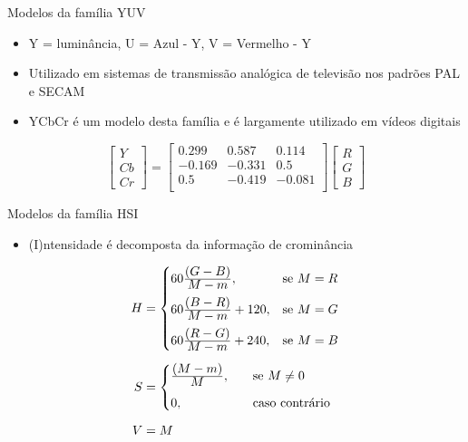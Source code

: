 \begin{frame}{Modelos da família YUV}
\begin{itemize}
    \item Y = luminância, U = Azul - Y, V = Vermelho - Y
    \item Utilizado em sistemas de transmissão analógica de televisão nos padrões PAL e SECAM
    \item YCbCr é um modelo desta família e é largamente utilizado em vídeos digitais
\end{itemize}
\begin{equation*}
  \begin{bmatrix}
    Y \\ Cb \\ Cr
  \end{bmatrix} = 
  \begin{bmatrix}
     0.299 &  0.587 &  0.114 \\
    -0.169 & -0.331 &  0.5   \\
     0.5   & -0.419 & -0.081 \\
  \end{bmatrix}
  \begin{bmatrix}
    R \\ G \\ B
  \end{bmatrix}
\end{equation*}
\end{frame}

\begin{frame}{Modelos da família HSI}
\begin{itemize}
    \item  (I)ntensidade é decomposta da informação de crominância
\end{itemize}
\begin{align*}
\begin{split}
  H &=  \begin{cases}
            60\frac{\displaystyle (G - B)}{\displaystyle M - m}, & \text{se}\ M = R\\[0.7em]
            60\frac{\displaystyle (B - R)}{\displaystyle M - m} + 120, & \text{se}\ M = G\\[0.7em]
            60\frac{\displaystyle (R - G)}{\displaystyle M - m} + 240, & \text{se}\ M = B
       \end{cases}
  \\[0.5em]
  S &=  \begin{cases}
            \frac{\displaystyle (M - m)}{\displaystyle M}, \quad &\text{se}\ M \neq 0\\[0.7em]
            0, \quad &\text{caso contrário}\\
       \end{cases}
  \\[0.5em]
  V &= M
\end{split}
\end{align*}
\end{frame}

